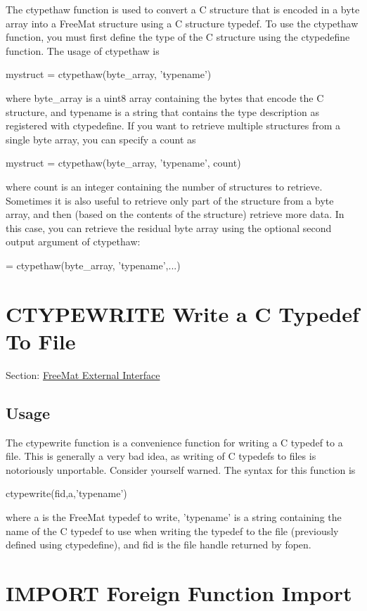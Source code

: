 The {\ttfamily ctypethaw} function is used to convert a C structure that is encoded in a byte array into a Free\-Mat structure using a C structure typedef. To use the {\ttfamily ctypethaw} function, you must first define the type of the C structure using the {\ttfamily ctypedefine} function. The usage of {\ttfamily ctypethaw} is \begin{DoxyVerb}  mystruct = ctypethaw(byte_array, 'typename')
\end{DoxyVerb}
 where {\ttfamily byte\-\_\-array} is a {\ttfamily uint8} array containing the bytes that encode the C structure, and {\ttfamily typename} is a string that contains the type description as registered with {\ttfamily ctypedefine}. If you want to retrieve multiple structures from a single byte array, you can specify a count as \begin{DoxyVerb}  mystruct = ctypethaw(byte_array, 'typename', count)
\end{DoxyVerb}
 where {\ttfamily count} is an integer containing the number of structures to retrieve. Sometimes it is also useful to retrieve only part of the structure from a byte array, and then (based on the contents of the structure) retrieve more data. In this case, you can retrieve the residual byte array using the optional second output argument of {\ttfamily ctypethaw}\-: \begin{DoxyVerb}   = ctypethaw(byte_array, 'typename',...)
\end{DoxyVerb}
 \hypertarget{external_ctypewrite}{}\section{C\-T\-Y\-P\-E\-W\-R\-I\-T\-E Write a C Typedef To File}\label{external_ctypewrite}
Section\-: \hyperlink{sec_external}{Free\-Mat External Interface} \hypertarget{vtkwidgets_vtkxyplotwidget_Usage}{}\subsection{Usage}\label{vtkwidgets_vtkxyplotwidget_Usage}
The {\ttfamily ctypewrite} function is a convenience function for writing a C typedef to a file. This is generally a very bad idea, as writing of C typedefs to files is notoriously unportable. Consider yourself warned. The syntax for this function is \begin{DoxyVerb}  ctypewrite(fid,a,'typename')
\end{DoxyVerb}
 where {\ttfamily a} is the Free\-Mat typedef to write, {\ttfamily 'typename'} is a string containing the name of the C typedef to use when writing the typedef to the file (previously defined using {\ttfamily ctypedefine}), and {\ttfamily fid} is the file handle returned by {\ttfamily fopen}. \hypertarget{external_import}{}\section{I\-M\-P\-O\-R\-T Foreign Function Import}\label{external_import}
